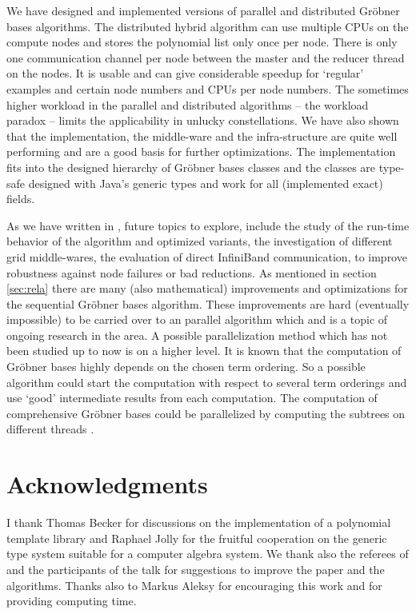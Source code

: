 \documentclass[10pt,twocolumn,a4paper]{article}
\begin{document}
We have designed and implemented versions of parallel and distributed
Gr\"obner bases algorithms.  The distributed hybrid algorithm can use
multiple CPUs on the compute nodes and stores the polynomial list only
once per node. There is only one communication channel per node
between the master and the reducer thread on the nodes.  It is usable
and can give considerable speedup for `regular' examples and certain
node numbers and CPUs per node numbers.  The sometimes higher workload
in the parallel and distributed algorithms -- the workload paradox --
limits the applicability in unlucky constellations.  We have also shown
that the implementation, the middle-ware and the infra-structure are
quite well performing and are a good basis for further optimizations.
The implementation fits into the designed hierarchy of Gr\"obner bases
classes and the classes are type-safe designed with Java's generic
types and work for all (implemented exact) fields.

As we have written in \cite{Kredel:2010}, future topics to explore,
include the study of the run-time behavior of the algorithm and
optimized variants, the investigation of different grid middle-wares,
the evaluation of direct Infini\-Band communication, to improve
robustness against node failures or bad reductions. As mentioned in
section \ref{sec:rela} there are many (also mathematical) improvements
and optimizations for the sequential Gr\"obner bases algorithm. These
improvements are hard (eventually impossible) to be carried over to an
parallel algorithm which and is a topic of ongoing research in the area.
A possible parallelization method which has not been studied up to now
is on a higher level.  It is known that the computation of Gr\"obner
bases highly depends on the chosen term ordering.  So a possible
algorithm could start the computation with respect to several term
orderings and use `good' intermediate results from each computation.
The computation of comprehensive Gr\"obner bases
could be parallelized by computing the subtrees on different threads 
\cite{Weispfenning:1992,Kredel:1992}.


\section*{Acknowledgments} 

I thank Thomas Becker for discussions on the implementation of a
polynomial template library and Raphael Jolly for the fruitful
cooperation on the generic type system suitable for a computer algebra
system.  We thank also the referees of \cite{Kredel:2009} and the
participants of the talk for suggestions to improve the paper and the
algorithms.  Thanks also to Markus Aleksy for encouraging this work and
\cite{bwgrid:2008} for providing computing time.





\end{document}
